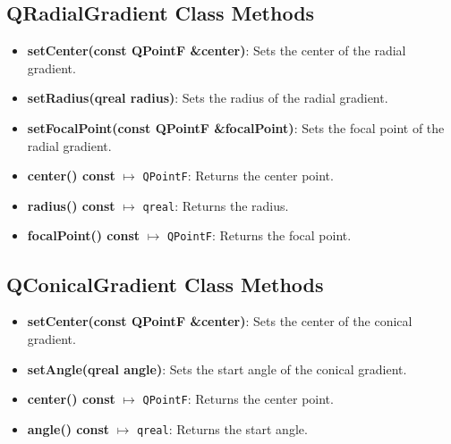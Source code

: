 \documentclass{report}
\begin{document}
    \subsection{QRadialGradient Class Methods}
    \begin{itemize}
        \item \textbf{setCenter(const QPointF \&center)}: Sets the center of the radial gradient.
        \item \textbf{setRadius(qreal radius)}: Sets the radius of the radial gradient.
        \item \textbf{setFocalPoint(const QPointF \&focalPoint)}: Sets the focal point of the radial gradient.
        \item \textbf{center() const} $\mapsto$ \texttt{QPointF}: Returns the center point.
        \item \textbf{radius() const} $\mapsto$ \texttt{qreal}: Returns the radius.
        \item \textbf{focalPoint() const} $\mapsto$ \texttt{QPointF}: Returns the focal point.
    \end{itemize}

    \bigbreak \noindent 
    \subsection{QConicalGradient Class Methods}
    \begin{itemize}
        \item \textbf{setCenter(const QPointF \&center)}: Sets the center of the conical gradient.
        \item \textbf{setAngle(qreal angle)}: Sets the start angle of the conical gradient.
        \item \textbf{center() const} $\mapsto$ \texttt{QPointF}: Returns the center point.
        \item \textbf{angle() const} $\mapsto$ \texttt{qreal}: Returns the start angle.
    \end{itemize}
\end{document}
